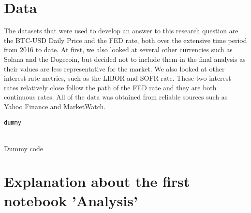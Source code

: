\documentclass[12pt]{article}
\begin{document}
\section{Data}

The datasets that were used to develop an answer to this research question are the BTC-USD Daily Price and the FED rate, both over the extensive time period from 2016 to date. At first, we also looked at several other currencies such as Solana and the Dogecoin, but decided not to include them in the final analysis as their values are less representative for the market. We also looked at other interest rate metrics, such as the LIBOR and SOFR rate. These two interest rates relatively close follow the path of the FED rate and they are both continuous rates. All of the data was obtained from reliable sources such as Yahoo Finance and MarketWatch.

\begin{Program}[!htb]
\begin{lstlisting}[style=Matlab-editor,basicstyle=\mlttfamily\footnotesize]
dummy
  
\end{lstlisting}
\caption{Dummy code}
\label{Dummy code}
\end{Program}

\section{Explanation about the first notebook 'Analysis'}
\end{document}
